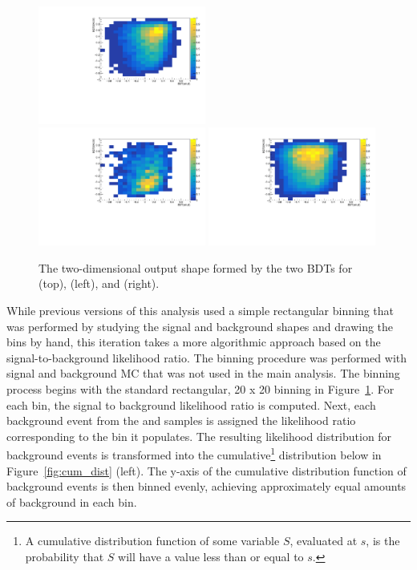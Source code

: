 \begin{figure}[htp]
\centering
\includegraphics[width=0.49\textwidth]{ch8_figs/tth_2l_2D.pdf}\\
\includegraphics[width=0.49\textwidth]{ch8_figs/tt_2l_2D.pdf}
\includegraphics[width=0.49\textwidth]{ch8_figs/ttw_2l_2D.pdf}
\caption[Two dimensional BDT output shapes of signal and backgrounds]{The two-dimensional output shape formed by the two BDTs for \tth (top), \ttbar (left), and \ttv (right).}
\label{fig:2d_shapes}
\end{figure}

While previous versions of this analysis used a simple rectangular binning that was performed by studying the signal and background shapes and drawing the bins by hand,
this iteration takes a more algorithmic approach based on the signal-to-background likelihood ratio. The binning procedure was performed with signal and background MC that was not used
in the main analysis. The binning process begins with the standard rectangular, 20 x 20 binning in Figure~\ref{fig:2d_shapes}. For each bin, the signal to background likelihood ratio is computed.
Next, each background event from the \ttbar and \ttv samples is assigned the likelihood ratio corresponding to the bin it populates. The resulting likelihood distribution for background
events is transformed into the cumulative\footnote{A cumulative distribution function of some variable $S$, evaluated at $s$, is the probability that $S$ will have a value less than or equal
to $s$.} distribution below in Figure~\ref{fig:cum_dist} (left). The y-axis of the cumulative distribution function of background events is then binned evenly, achieving approximately equal
amounts of background in each bin.

